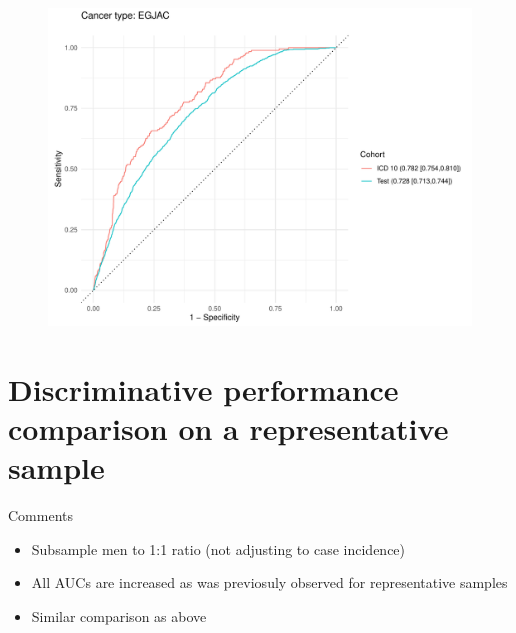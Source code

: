 \documentclass[english]{article}
\begin{document}
\begin{figure}[h]
\centering
\includegraphics[width=0.8\linewidth]{icd10/roc_EGJAC.pdf}
\end{figure}



\newpage
\clearpage
\section{Discriminative performance comparison on a representative sample}

Comments
\begin{itemize}
	\item Subsample men to 1:1 ratio (not adjusting to case incidence)
	\item All AUCs are increased as was previosuly observed for representative samples
	\item Similar comparison as above
\end{itemize}
\end{document}
